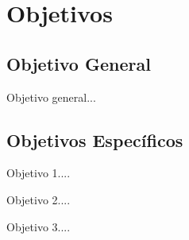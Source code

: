 \section{Objetivos\label{sec:objetivos}}

\subsection{Objetivo General}
Objetivo general...


\subsection{Objetivos Específicos}

\begin{misObjetivosEspecificos}
    \objItem Objetivo 1....
    
    \objItem Objetivo 2.... 
       
    \objItem Objetivo 3....
    
\end{misObjetivosEspecificos}